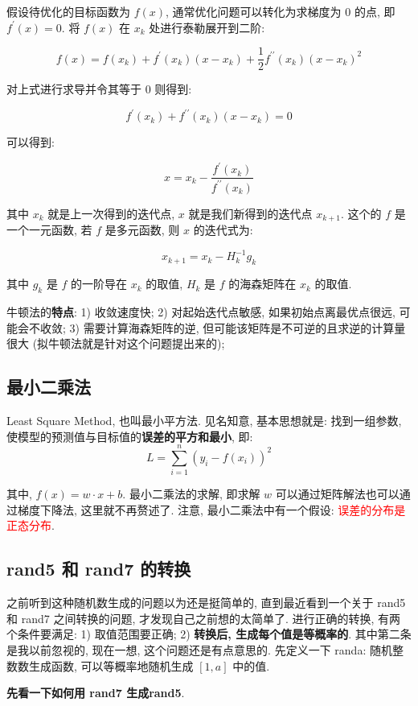 假设待优化的目标函数为 $f(x)$, 通常优化问题可以转化为求梯度为 0 的点, 即 $f^{\prime}(x) = 0$. 将 $f(x)$ 在 $x_k$ 处进行泰勒展开到二阶:

$$
f(x)=f\left(x_{k}\right)+f^{\prime}\left(x_{k}\right)\left(x-x_{k}\right)+\frac{1}{2} f^{\prime \prime}\left(x_{k}\right)\left(x-x_{k}\right)^{2}
$$

对上式进行求导并令其等于 0 则得到:

$$
f^{\prime}\left(x_{k}\right)+f^{\prime \prime}\left(x_{k}\right)\left(x-x_{k}\right)=0
$$

可以得到:

$$
x=x_{k}-\frac{f^{\prime}\left(x_{k}\right)}{f^{\prime \prime}\left(x_{k}\right)}
$$

其中 $x_k$ 就是上一次得到的迭代点, $x$ 就是我们新得到的迭代点 $x_{k+1}$. 这个的 $f$ 是一个一元函数, 若 $f$ 是多元函数, 则 $x$ 的迭代式为:

$$
x_{k+1} = x_k - H^{-1}_k g_k
$$

其中 $g_k$ 是 $f$ 的一阶导在 $x_k$ 的取值, $H_k$ 是 $f$ 的海森矩阵在 $x_k$ 的取值.

牛顿法的\textbf{特点}: 1) 收敛速度快; 2) 对起始迭代点敏感, 如果初始点离最优点很远, 可能会不收敛; 3) 需要计算海森矩阵的逆, 但可能该矩阵是不可逆的且求逆的计算量很大 (拟牛顿法就是针对这个问题提出来的); 

\subsection{最小二乘法}
Least Square Method, 也叫最小平方法. 见名知意, 基本思想就是: 找到一组参数, 使模型的预测值与目标值的\textbf{误差的平方和最小}, 即:
$$
L = \sum_{i=1}^n (y_i - f(x_i))^2
$$

其中, $f(x) = w \cdot x + b$. 最小二乘法的求解, 即求解 $w$ 可以通过矩阵解法也可以通过梯度下降法, 这里就不再赘述了. 注意, 最小二乘法中有一个假设: \textcolor{red}{误差的分布是正态分布}.

\subsection{rand5 和 rand7 的转换}
之前听到这种随机数生成的问题以为还是挺简单的, 直到最近看到一个关于 rand5 和 rand7 之间转换的问题, 才发现自己之前想的太简单了. 进行正确的转换, 有两个条件要满足: 1) 取值范围要正确; 2) \textbf{转换后, 生成每个值是等概率的}. 其中第二条是我以前忽视的, 现在一想, 这个问题还是有点意思的. 先定义一下 randa: 随机整数数生成函数, 可以等概率地随机生成 $[1, a]$ 中的值. 

\textbf{先看一下如何用 rand7 生成rand5}. 

